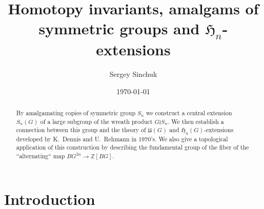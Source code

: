 \documentclass[oneside, 12pt]{amsart}
\title{Homotopy invariants, amalgams of symmetric groups and $\mathfrak{H}_n$-extensions}
\author {Sergey Sinchuk}
\date {\today}
\theoremstyle{plain}
\numberwithin{equation}{section}
\numberwithin{lemma}{section}
\theoremstyle{remark}
\theoremstyle{definition}
\DeclareMathOperator{\colim}{colim}
\begin{document}
\begin{abstract} By amalgamating copies of symmetric group $S_n$ we construct a central extension $S_n(G)$ of a large subgroup of the wreath product $G \wr S_n$.
We then establish a connection between this group and the theory of $\mathfrak{U}(G)$ and $\mathfrak{H}_n(G)$-extensions developed by K.~Dennis and U.~Rehmann in 1970's.
We also give a topological application of this construction by describing the fundamental group of the fiber of the ``alternating`` map $BG^{2n}\to \mathbb{Z}[BG]$.
\end{abstract}

\maketitle

\section{Introduction}
\begin{comment}
Let $G$ be a group. In~\cite{De76} K.~Dennis defined certain central extension $(G, G)$ of the derived subgroup $[G, G]$ 
 (see section~\ref{ssec:extensions} below for the definition).
This extension is a quotient of the nonabelian tensor square $G \otimes G$ (but is itself an extension of $\bigwedge^2G$) such that the kernel of the natural map $(G, G) \to [G, G]$ 
 is Dennis functor $\widetilde{H}_2(G, \mathbb{Z})$.
Under the notation $U(G)$ the same extension appears in U.~Rehmann's paper~\cite{Reh78}, where it is used to formulate the noncommutative version of Matsumoto theorem.
Recall that this theorem asserts for a skew-field $D$ that the group $K_2(D)$ is precisely the quotient of $\widetilde{H}_2(D^*, \mathbb{Z})$ modulo Steinberg relations $\{u, 1-u\} = 1$, $u\in D^*$.

The aim of this note is to describe yet another situation in which the groups $(G, G)$ and $\Lambda^2(G)$ make an appearance.

{\bf TODO: Mention new simpler presentation of Rehmann's extensions for $n\geq 4$}


Unsurprisingly, the main motivation for the definition of the group $S_n(G)$ comes from algebraic topology.
More specifically, our initial question was to describe the fiber of the ''alternating map`` $X^{2n} \to \mathbb{Z}[X]$ in the special case $X=BG$.
\end{comment}
\end{document}

